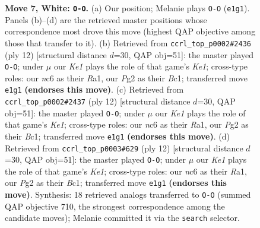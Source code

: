 \documentclass[11pt]{article}
\begin{document}
\begin{figure}[p]
\caption{\textbf{Move 7, White: \texttt{O-O}.} (a) Our position; Melanie plays \texttt{O-O} (\texttt{e1g1}). Panels (b)--(d) are the retrieved master positions whose correspondence most drove this move (highest QAP objective among those that transfer to it). (b) Retrieved from \texttt{ccrl\_top\_p0002\#2436} (ply 12) [structural distance $d$=30, QAP obj=51]: the master played \texttt{O-O}; under $\mu$ our \emph{Ke1} plays the role of that game's \emph{Ke1}; cross-type roles: our \emph{n}c6 as their \emph{R}a1, our \emph{P}g2 as their \emph{B}c1; transferred move \texttt{e1g1} \textbf{(endorses this move)}. (c) Retrieved from \texttt{ccrl\_top\_p0002\#2437} (ply 12) [structural distance $d$=30, QAP obj=51]: the master played \texttt{O-O}; under $\mu$ our \emph{Ke1} plays the role of that game's \emph{Ke1}; cross-type roles: our \emph{n}c6 as their \emph{R}a1, our \emph{P}g2 as their \emph{B}c1; transferred move \texttt{e1g1} \textbf{(endorses this move)}. (d) Retrieved from \texttt{ccrl\_top\_p0003\#629} (ply 12) [structural distance $d$=30, QAP obj=51]: the master played \texttt{O-O}; under $\mu$ our \emph{Ke1} plays the role of that game's \emph{Ke1}; cross-type roles: our \emph{n}c6 as their \emph{R}a1, our \emph{P}g2 as their \emph{B}c1; transferred move \texttt{e1g1} \textbf{(endorses this move)}. Synthesis: 18 retrieved analogs transferred to \texttt{O-O} (summed QAP objective 710, the strongest correspondence among the candidate moves); Melanie committed it via the \texttt{search} selector.}
\label{fig:thought-m12}
\end{figure}

\clearpage
\end{document}
